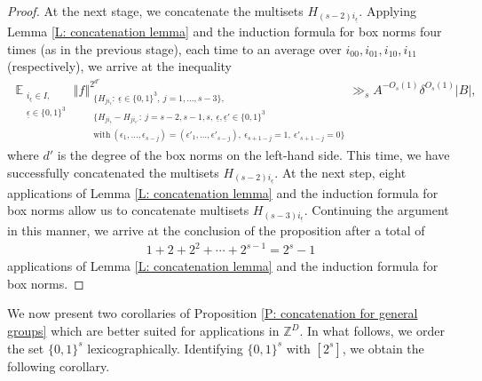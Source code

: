 \documentclass[11pt]{amsart}
\theoremstyle{definition}
\DeclareMathOperator*{\E}{\mathbb{E}}
\newcommand{\Z}{{\mathbb Z}}
\newcommand{\ueps}{{\underline{\epsilon}}}
\newcommand{\norm}[1]{\left\Vert #1\right\Vert}
\begin{document}
\begin{proof}
At the next stage, we concatenate the multisets $H_{(s-2)i_\ueps}$. Applying Lemma \ref{L: concatenation lemma} and the induction formula for box norms four times (as in the previous stage), each time to an average over $i_{00}, i_{01}, i_{10}, i_{11}$ (respectively), we arrive at the inequality
\begin{align*}
        \E_{\substack{i_{\ueps}\in I,\\ \ueps\in\{0,1\}^3}} \norm{f}_{\substack{\{H_{j i_\ueps}:\ \ueps\in\{0,1\}^3,\ j=1, \ldots, s-3\},\\ \{H_{j i_\ueps}-H_{j i_{\ueps'}}:\ j= s-2, s-1, s,\ \ueps,\ueps'\in\{0,1\}^3\\ \mathrm{with}\ (\epsilon_1, \ldots, \epsilon_{s-j}) = (\epsilon'_1, \ldots, \epsilon'_{s-j}),\ \epsilon_{s+1-j} = 1,\ \epsilon'_{s+1-j} = 0\}}}^{2^{d'}} %
        \gg_{s} A^{-O_s(1)} \delta^{O_s(1)}|B|,
\end{align*}
where $d'$ is the degree of the box norms on the left-hand side.
This time, we have successfully concatenated the {multisets} $H_{(s-2)i_\ueps}$. At the next step, eight applications of Lemma \ref{L: concatenation lemma} and the induction formula for box norms allow us to concatenate {multisets} $H_{(s-3)i_\ueps}$. Continuing the argument in this manner, we arrive at the conclusion of the proposition after a total of 
\begin{align*}
    1 + 2 + 2^2 + \cdots + 2^{s-1} = 2^s - 1
\end{align*}
applications of Lemma \ref{L: concatenation lemma} and the induction formula for box norms.
\end{proof}

We now present two corollaries of Proposition \ref{P: concatenation for general groups} which are better suited for applications in $\Z^D$. 
In what follows, we order the set $\{0,1\}^s$ lexicographically.
Identifying $\{0,1\}^s$ with $[2^s]$, we obtain the following corollary.
\end{document}

